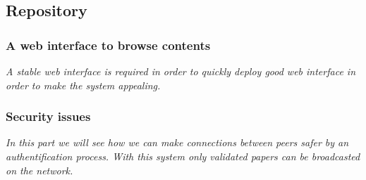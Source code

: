 \subsection{Repository}

\subsubsection{A web interface to browse contents}

\textit{A stable web interface is required in order to
quickly deploy good web interface in order to make the system
appealing.}

\subsubsection{Security issues}

\textit{In this part we will see how we can make connections
between peers safer by an authentification process. With this
system only validated papers can be broadcasted on the network.}
